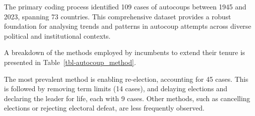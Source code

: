 \documentclass[
  12pt,
]{report}
\begin{document}
The primary coding process identified 109 cases of autocoups between
1945 and 2023, spanning 73 countries. This comprehensive dataset
provides a robust foundation for analysing trends and patterns in
autocoup attempts across diverse political and institutional contexts.

A breakdown of the methods employed by incumbents to extend their tenure
is presented in Table~\ref{tbl-autocoup_method}.

\begin{table}

\caption{\label{tbl-autocoup_method}Autocoup methods and success rates
(1945-2023)}


\end{table}%

The most prevalent method is enabling re-election, accounting for 45
cases. This is followed by removing term limits (14 cases), and delaying
elections and declaring the leader for life, each with 9 cases. Other
methods, such as cancelling elections or rejecting electoral defeat, are
less frequently observed.
\end{document}
